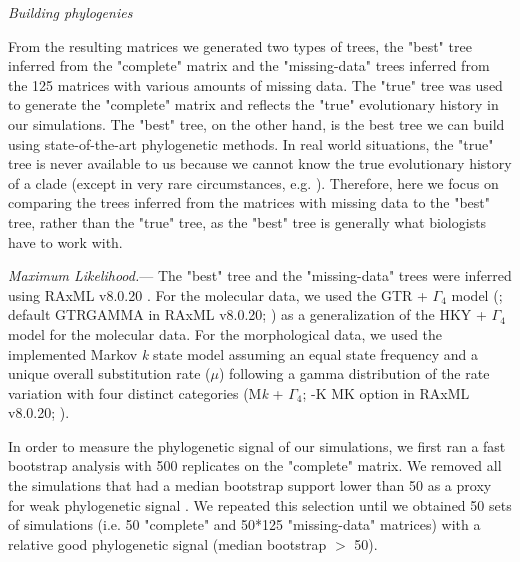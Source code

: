 \documentclass[12pt,letterpaper]{article}
\renewcommand{\subsection}[1]{%
\bigskip
\begin{center}
\begin{large}
\normalfont\itshape #1
\end{large}
\end{center}}
\renewcommand{\subsubsection}[1]{%
\vspace{2ex}
\noindent
\textit{#1.}---}
\begin{document}

\subsection{Building phylogenies}
From the resulting matrices we generated two types of trees, the "best" tree inferred from the "complete" matrix and the "missing-data" trees inferred from the 125 matrices with various amounts of missing data. The "true" tree was used to generate the "complete" matrix and reflects the "true" evolutionary history in our simulations. The "best" tree, on the other hand, is the best tree we can build using state-of-the-art phylogenetic methods. In real world situations, the "true" tree is never available to us because we cannot know the true evolutionary history of a clade (except in very rare circumstances, e.g. \citealt{rozen2005}). Therefore, here we focus on comparing the trees inferred from the matrices with missing data to the "best" tree, rather than the "true" tree, as the "best" tree is generally what biologists have to work with.

\subsubsection{Maximum Likelihood}
The "best" tree and the "missing-data" trees were inferred using RAxML v8.0.20 \citep{Stamatakis21012014}. For the molecular data, we used the GTR + $\Gamma_4$ model (\citealt{tavare1986}; default GTRGAMMA in RAxML v8.0.20; \citealt{Stamatakis21012014}) as a generalization of the HKY + $\Gamma_4$ model \citep{HKY85} for the molecular data.
For the morphological data, we used the implemented Markov \textit{k} state model \citep{lewisa2001} %
 assuming an equal state frequency and a unique overall substitution rate ($\mu$) following a gamma distribution of the rate variation with four distinct categories (M\textit{k} + $\Gamma_4$; -K MK option in RAxML v8.0.20; \citealt{Stamatakis21012014}).

In order to measure the phylogenetic signal of our simulations, we first ran a fast bootstrap analysis with 500 replicates on the "complete" matrix. We removed all the simulations that had a median bootstrap support lower than 50 as a proxy for weak phylogenetic signal \citep{zanderminimal2004}. We repeated this selection until we obtained 50 sets of simulations (i.e. 50 "complete" and 50*125 "missing-data" matrices) with a relative good phylogenetic signal (median bootstrap $>$ 50).
\end{document}
